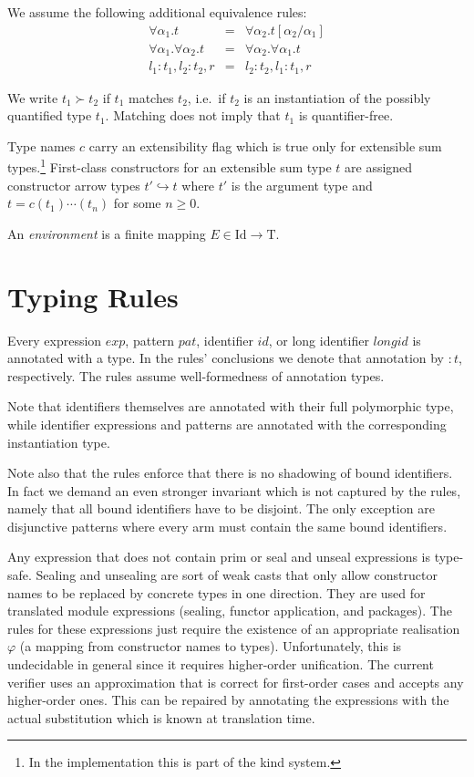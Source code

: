 \documentclass[twoside]{article}
\newcommand{\conarrow}{\hookrightarrow}
\newcommand{\x}[1]{\mathit{#1}}
\newcommand{\f}[1]{\mbox{#1}}
\newcommand{\id}{\x{id}}
\newcommand{\longid}{\x{longid}}
\renewcommand{\exp}{\x{exp}}
\newcommand{\pat}{\x{pat}}
\begin{document}
We assume the following additional equivalence rules:
\begin{eqnarray*}
\forall \alpha_1.t &=& \forall \alpha_2.t[\alpha_2/\alpha_1] \\
\forall \alpha_1.\forall \alpha_2.t &=& \forall \alpha_2.\forall \alpha_1.t \\
l_1:t_1,l_2:t_2,r &=& l_2:t_2,l_1:t_1,r
\end{eqnarray*}

We write $t_1 \succ t_2$ if $t_1$ matches $t_2$, i.e.\ if $t_2$ is an instantiation of the possibly quantified type $t_1$. Matching does not imply that $t_1$ is quantifier-free.

Type names $c$ carry an extensibility flag which is true only for extensible sum types.\footnote{In the implementation this is part of the kind system.} First-class constructors for an extensible sum type $t$ are assigned constructor arrow types $t' \conarrow t$ where $t'$ is the argument type and $t = c(t_1)\cdots(t_n)$ for some $n\geq0$.

An {\em environment} is a finite mapping $E \in \f{Id}\to\f{T}$.


\section{Typing Rules}
\label{typing}

Every expression $\exp$, pattern $\pat$, identifier $\id$, or long identifier $\longid$ is annotated with a type. In the rules' conclusions we denote that annotation by $:t$, respectively. The rules assume well-formedness of annotation types.

Note that identifiers themselves are annotated with their full polymorphic type, while identifier expressions and patterns are annotated with the corresponding instantiation type.

Note also that the rules enforce that there is no shadowing of bound identifiers. In fact we demand an even stronger invariant which is not captured by the rules, namely that all bound identifiers have to be disjoint. The only exception are disjunctive patterns where every arm must contain the same bound identifiers.

Any expression that does not contain \f{prim} or \f{seal} and \f{unseal} expressions is type-safe. Sealing and unsealing are sort of weak casts that only allow constructor names to be replaced by concrete types in one direction. They are used for translated module expressions (sealing, functor application, and packages). The rules for these expressions just require the existence of an appropriate realisation $\varphi$ (a mapping from constructor names to types). Unfortunately, this is undecidable in general since it requires higher-order unification. The current verifier uses an approximation that is correct for first-order cases and accepts any higher-order ones. This can be repaired by annotating the expressions with the actual substitution which is known at translation time.
\end{document}
